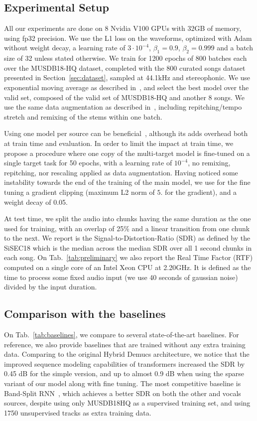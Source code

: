 \documentclass{article}
\begin{document}
\subsection{Experimental Setup}
All our experiments are done on 8 Nvidia V100 GPUs with 32GB of memory, using fp32 precision. We use the L1 loss on the waveforms, optimized with Adam \cite{adam} without weight decay, a learning rate of $3 \cdot 10^{-4}$, $\beta_1 = 0.9$, $\beta_2 = 0.999$ and a batch size of 32 unless stated otherwise. We train for 1200 epochs of 800 batches each over the MUSDB18-HQ dataset, completed with
the 800 curated songs dataset presented in Section~\ref{sec:dataset}, sampled at 44.1kHz and stereophonic. We use exponential moving average
as described in~\cite{defossez2021hybrid}, and select the best model over the valid set, composed of the valid set
of MUSDB18-HQ and another 8 songs.
We use the same data augmentation as described in~\cite{defossez2021hybrid}, including repitching/tempo stretch
and remixing of the stems within one batch.

Using one model per source can be beneficial~\cite{bsrnn}, although its adds overhead both at train time
and evaluation. In order to limit the impact at train time, we propose a  procedure
where one copy of the multi-target model is fine-tuned on a single target task for 50 epochs, with a learning rate of $10^{-4}$, no remixing, repitching, nor rescaling applied as data augmentation.
Having noticed some instability towards the end of the training of the main model, we use for the fine tuning a gradient clipping (maximum L2 norm of $5.$ for the gradient), and a weight decay of 0.05. 

At test time, we split the audio into chunks having the same duration as the one used for training, with an overlap of 25\% and a linear transition from one chunk to the next.
We report is the Signal-to-Distortion-Ratio (SDR) as defined by the SiSEC18 \cite{sisec18} which is the median across the median SDR over all 1 second chunks in each song. On Tab.~\ref{tab:preliminary} we also report the Real Time Factor (RTF)
computed on a single core of an Intel Xeon CPU at 2.20GHz. It is defined as the time to process some fixed audio input (we use 40 seconds of gaussian noise) divided by the input duration.

\subsection{Comparison with the baselines}

On Tab.~\ref{tab:baselines}, we compare to several state-of-the-art baselines. For reference, we also provide
baselines that are trained without any extra training data. Comparing to the original Hybrid Demucs architecture,
we notice that the improved sequence modeling capabilities of transformers increased the SDR by 0.45 dB for the simple version, and up to almost 0.9 dB when using the sparse variant of our model along with fine tuning.
The most competitive baseline is Band-Split RNN~\cite{bsrnn}, which achieves a better SDR on both the other and vocals sources, despite using only MUSDB18HQ as a supervised training set, and using 1750 unsupervised tracks as extra training data.
\end{document}
